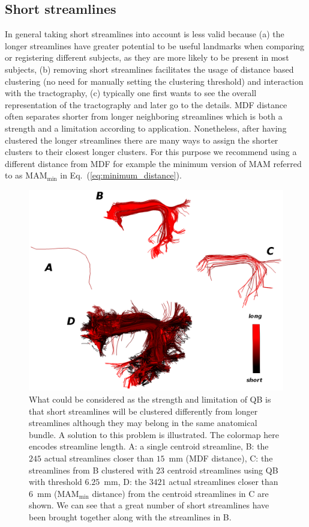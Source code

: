 \documentclass{bioinfo}
\begin{document}
\subsection{Short streamlines\label{sub:short_tracks}}

In general taking short streamlines into account is less valid because
(a) the longer streamlines have greater potential to be useful landmarks
when comparing or registering different subjects, as they are more
likely to be present in most subjects, (b) removing short streamlines
facilitates the usage of distance based clustering (no need for manually
setting the clustering threshold) and interaction with the tractography,
(c) typically one first wants to see the overall representation of the
tractography and later go to the details. MDF distance often separates
shorter from longer neighboring streamlines which is both a strength and
a limitation according to application. Nonetheless, after having
clustered the longer streamlines there are many ways to assign the
shorter clusters to their closest longer clusters. For this purpose we
recommend using a different distance from MDF for example the minimum
version of MAM referred to as $\textrm{MAM}_{\textrm{min}}$ in
Eq.~(\ref{eq:minimum_distance}).

\begin{figure}
  \centerline{\hspace{-1.5mm}\includegraphics[scale=0.65]{Figures/Fig_10_arcuate_small_fibers}}
  \caption{What could be considered as the strength and limitation of QB
    is that short streamlines will be clustered differently from longer
    streamlines although they may belong in the same anatomical
    bundle. A solution to this problem is illustrated. The colormap here
    encodes streamline length. A: a single centroid streamline, B: the
    $245$ actual streamlines closer than $15$~mm (MDF distance), C: the
    streamlines from B clustered with $23$ centroid streamlines using QB
    with threshold $6.25$~mm, D: the $\num{3421}$ actual streamlines
    closer than $6$~mm ($\textrm{MAM}_{\textrm{min}}$ distance) from the
    centroid streamlines in C are shown. We can see that a great number
    of short streamlines have been brought together along with the
    streamlines in B. \label{Flo:arcuate_close}}
\end{figure}
\end{document}
